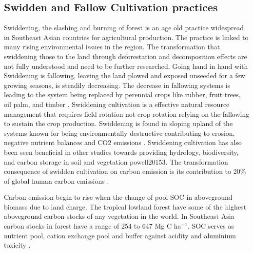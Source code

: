 \subsection{Swidden and Fallow Cultivation practices}

Swiddening, the slashing and burning of forest is an age old practice widespread in Southeast Asian countries for agricultural production. The practice is linked to many rising environmental issues in the region. The transformation that swiddening those to the land through deforestation and decomposition effects are not fully understood and need to be further researched. Going hand in hand with Swiddening is fallowing, leaving the land plowed and exposed unseeded for a few growing seasons, is steadily decreasing. The decrease in fallowing systems is leading to the system being replaced by perennial crops like rubber, fruit trees, oil palm, and timber \citep{schmidt2009assessment}. Swiddening cultivation is a effective natural resource management that requires field rotation not crop rotation relying on the fallowing to sustain the crop production. Swiddening is found in sloping upland of the systems known for being environmentally destructive contributing to erosion, negative nutrient balances and CO2 emissions \citep{de2008soil}. Swiddening cultivation has also been seen beneficial in other studies towards providing hydrology, biodiversity, and carbon storage in soil and vegetation {powell20153}. The transformation consequence of swidden cultivation on carbon emission is its contribution to 20\% of global human carbon emissions \citep{meehl2007global}.

Carbon emission begin to rise when the change of pool SOC in aboveground biomass due to land charge. The tropical lowland forest have some of the highest aboveground carbon stocks of any vegetation in the world. In Southeast Asia carbon stocks in forest have a range of 254 to 647 Mg C ha$^{-1}$. SOC serves as nutrient pool, cation exchange pool and buffer against acidity and aluminium toxicity \citep{silver2000potential}.

